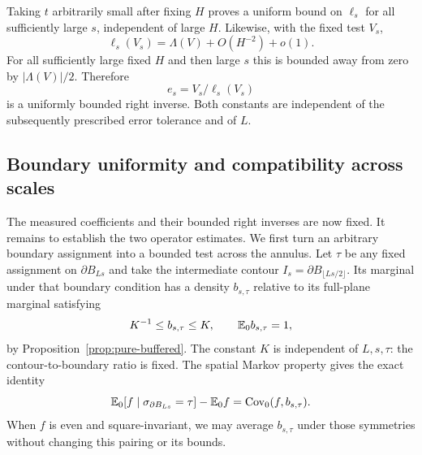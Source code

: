 Taking $t$ arbitrarily small after fixing $H$ proves a uniform bound
on $\ell_s$ for all sufficiently large $s$, independent of large $H$.
Likewise, with the fixed test $V_s$,
\[
 \ell_s(V_s)=\Lambda(V)+O(H^{-2})+o(1).
\]
For all sufficiently large fixed $H$ and then large $s$ this is
bounded away from zero by $|\Lambda(V)|/2$.  Therefore
\begin{equation}
 e_s=V_s/\ell_s(V_s)
 \label{eq:transfer-right-inverse}
\end{equation}
is a uniformly bounded right inverse.  Both constants are independent
of the subsequently prescribed error tolerance and of $L$.

\subsection{Boundary uniformity and compatibility across scales}

The measured coefficients and their bounded right inverses are now fixed.
It remains to establish the two operator estimates.  We first turn an
arbitrary boundary assignment into a bounded test across the annulus.
Let $\tau$ be any fixed
assignment on $\partial B_{Ls}$ and take the intermediate contour
$I_s=\partial B_{\lfloor Ls/2\rfloor}$.  Its marginal under that
boundary condition has a density $b_{s,\tau}$ relative to its
full-plane marginal satisfying
\begin{equation}
 K^{-1}\leq b_{s,\tau}\leq K,\qquad \mathbb E_0 b_{s,\tau}=1,
 \label{eq:transfer-boundary-density}
\end{equation}
by Proposition~\ref{prop:pure-buffered}.  The constant $K$ is
independent of $L,s,\tau$: the contour-to-boundary ratio is fixed.
The spatial Markov property gives the exact identity
\begin{equation}
 \mathbb E_0[f\mid\sigma_{\partial B_{Ls}}=\tau]-\mathbb E_0f
       =\operatorname{Cov}_0(f,b_{s,\tau}).
 \label{eq:transfer-boundary-pairing}
\end{equation}
When $f$ is even and square-invariant, we may average $b_{s,\tau}$
under those symmetries without changing this pairing or its bounds.

